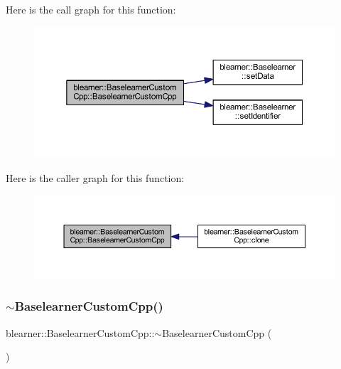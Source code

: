 Here is the call graph for this function\+:\nopagebreak
\begin{figure}[H]
\begin{center}
\leavevmode
\includegraphics[width=350pt]{classblearner_1_1_baselearner_custom_cpp_a7714c44164d0f763a861217ff2d53480_cgraph}
\end{center}
\end{figure}
Here is the caller graph for this function\+:\nopagebreak
\begin{figure}[H]
\begin{center}
\leavevmode
\includegraphics[width=350pt]{classblearner_1_1_baselearner_custom_cpp_a7714c44164d0f763a861217ff2d53480_icgraph}
\end{center}
\end{figure}
\mbox{\label{classblearner_1_1_baselearner_custom_cpp_a67aa938d71013c6e931d3edc563935bb}} 
\subsubsection{\texorpdfstring{$\sim$\+Baselearner\+Custom\+Cpp()}{~BaselearnerCustomCpp()}}
{\footnotesize\ttfamily blearner\+::\+Baselearner\+Custom\+Cpp\+::$\sim$\+Baselearner\+Custom\+Cpp (\begin{DoxyParamCaption}{ }\end{DoxyParamCaption})}



